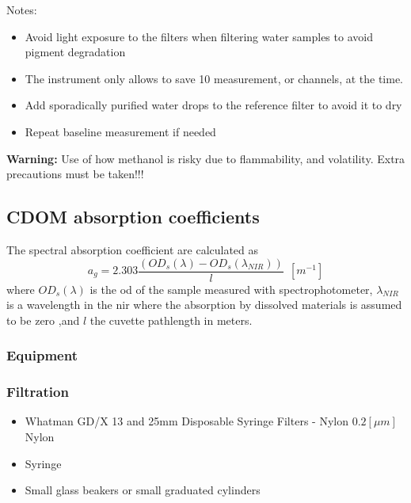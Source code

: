 \begin{appendices}
Notes:
\begin{itemize}[itemsep=2pt,parsep=2pt]
  \item Avoid light exposure to the filters when filtering water samples to avoid pigment degradation
  \item The instrument only allows to save 10 measurement, or channels, at the time. 
  \item Add sporadically purified water drops to the reference filter to avoid it to dry
  \item Repeat baseline measurement if needed
\end{itemize}  
{\bf Warning:}  Use of how methanol is risky due to flammability, and volatility. Extra precautions must be taken!!!


\subsection{CDOM absorption coefficients}
The spectral absorption coefficient are calculated as \citep{Mitchell2002}
\begin{equation}
  a_g=2.303 \frac{(OD_s(\lambda)-OD_s(\lambda_{NIR}))}{l}~~[m^{-1}]
\end{equation}
\noindent where $OD_s(\lambda)$ is the \gls{od} of the sample measured with spectrophotometer, $\lambda_{NIR}$ is a wavelength in the \gls{nir} where the absorption by dissolved materials is assumed to be zero ,and $l$ the cuvette pathlength in meters.

\subsubsection{Equipment}
\subsubsection*{Filtration}
\begin{itemize}[itemsep=2pt,parsep=2pt]
  \item Whatman GD/X 13 and 25mm Disposable Syringe Filters - Nylon $0.2[\mu m]$ Nylon
  \item Syringe
  \item Small glass beakers or small graduated cylinders
\end{itemize}

\end{appendices}
